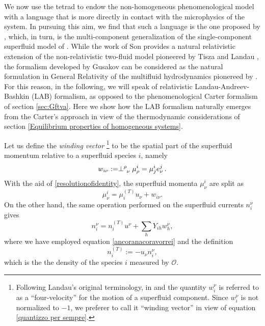 \documentclass[usenatbib]{mnras}
\begin{document}
We now use the tetrad to endow the non-homogeneous phenomenological model with a  language that is more directly in contact with the microphysics of the system. In pursuing this aim, we find that such a language is the one proposed by \cite{GusakovAndersson2006}, which, in turn, is the multi-component generalization of the single-component  superfluid model of \cite{Son2001}.
While the work of Son provides a natural relativistic extension of the non-relativistic two-fluid model pioneered by Tisza and Landau \citep[see e.g. ][]{landau6}, the formalism developed by Gusakov can be considered as the natural formulation in General Relativity of the multifluid hydrodynamics pionereed by \cite{andreevbashkin1976}.
For this reason, in the following, we will speak of relativistic Landau-Andreev-Bashkin (LAB) formalism, as opposed to the phenomenological Carter formalism of section  \ref{sec:Gftva}.
%
%
Here we show how the LAB formalism naturally emerges from the Carter's approach in view of the thermodynamic considerations of section \ref{Equilibrium properties of homogeneous systems}.

Let us define the \textit{winding vector}
\footnote{
Following Landau's original terminology, in \cite{GusakovAndersson2006} and \cite{Gusakov2007} the quantity $w_i^\nu$ is referred to as a ``four-velocity'' for the motion of a superfluid component. Since $w_i^\nu$ is not normalized to $-1$, we preferer to call it ``winding vector'' in view of equation \eqref{quantizzo per sempre}. } 
to be the spatial part of the superfluid momentum relative to a superfluid species $i$, namely
%
\begin{equation}\label{defhydro1}
w_{i\nu} := \perp\indices{^\rho _\nu} \mu^i_\rho = \mu^i_j e^j_\nu  \, .
\end{equation}
%
With the aid of \eqref{resolutionofidentity}, the superfluid momenta $\mu^i_\nu$  are split as
%
\begin{equation}\label{ilcatalicammello3}
\mu^i_\nu = \mu_i^{(T)} u_\nu + w_{i\nu} .
\end{equation}
%
On the other hand,  the same operation performed on the superfluid currents $n_i^\nu$ gives
%
\begin{equation}\label{ilcatalicammello5}
n_i^\nu = n_i^{(T)} u^\nu + \sum_h Y_{ih} w^{\nu}_h,
\end{equation} 
%
where we have employed equation \eqref{ancoranacoravorrei} and the definition
%
\begin{equation}\label{defhydro2}
n_i^{(T)} := -u_\nu n_i^\nu,
\end{equation}
%
which is the the density of the species $i$  measured by $\mathcal{O}$.
\end{document}

